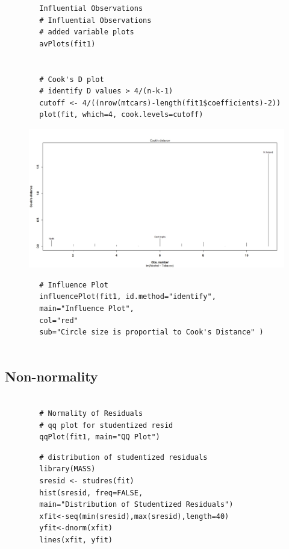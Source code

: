 \documentclass[main.tex]{subfiles}
\begin{document}
	
	\bigskip
	\begin{framed}
		\begin{verbatim}
		Influential Observations
		# Influential Observations
		# added variable plots 
		avPlots(fit1)
		
		
		# Cook's D plot
		# identify D values > 4/(n-k-1) 
		cutoff <- 4/((nrow(mtcars)-length(fit1$coefficients)-2)) 
		plot(fit, which=4, cook.levels=cutoff)
		\end{verbatim}
	\end{framed}
	\begin{figure}
		\centering
		\includegraphics[width=0.7\linewidth]{alcotob6}
		\caption{}
		\label{fig:alcotob6}
	\end{figure}
	
	\bigskip
	\begin{framed}
		\begin{verbatim}
		# Influence Plot 
		influencePlot(fit1,	id.method="identify", 
		main="Influence Plot", 
		col="red"
		sub="Circle size is proportial to Cook's Distance" )
		
		\end{verbatim}
	\end{framed}
	\subsection*{Non-normality}
	
	\begin{framed}
		\begin{verbatim}
		
		# Normality of Residuals
		# qq plot for studentized resid
		qqPlot(fit1, main="QQ Plot")
		\end{verbatim}
	\end{framed}
	
	\begin{framed}
		\begin{verbatim}
		# distribution of studentized residuals
		library(MASS)
		sresid <- studres(fit) 
		hist(sresid, freq=FALSE, 
		main="Distribution of Studentized Residuals")
		xfit<-seq(min(sresid),max(sresid),length=40) 
		yfit<-dnorm(xfit) 
		lines(xfit, yfit)
		\end{verbatim}
	\end{framed}
\end{document}
